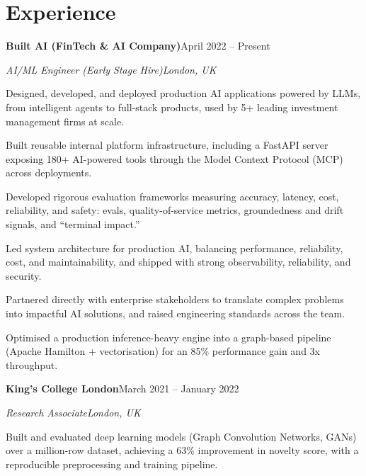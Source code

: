 \documentclass[10pt,a4paper]{article}
\newcommand{\entry}[4]{%
  {\color{company}\bfseries #1}\hfill {\color{muted}#2}\par
  \vspace{1pt}
  {\itshape #3}\hfill {\color{muted}\itshape #4}\par
  \vspace{3pt}%
}
\begin{document}
\section{Experience}
\entry{Built AI (FinTech \& AI Company)}{April 2022 -- Present}{AI/ML Engineer (Early Stage Hire)}{London, UK}
\begin{tight}
  \item Designed, developed, and deployed production AI applications powered by LLMs, from intelligent agents to full-stack products, used by 5+ leading investment management firms at scale.
  \item Built reusable internal platform infrastructure, including a FastAPI server exposing 180+ AI-powered tools through the Model Context Protocol (MCP) across deployments.
  \item Developed rigorous evaluation frameworks measuring accuracy, latency, cost, reliability, and safety: evals, quality-of-service metrics, groundedness and drift signals, and ``terminal impact.''
  \item Led system architecture for production AI, balancing performance, reliability, cost, and maintainability, and shipped with strong observability, reliability, and security.
  \item Partnered directly with enterprise stakeholders to translate complex problems into impactful AI solutions, and raised engineering standards across the team.
  \item Optimised a production inference-heavy engine into a graph-based pipeline (Apache Hamilton + vectorisation) for an 85\% performance gain and 3x throughput.
\end{tight}

\entry{King's College London}{March 2021 -- January 2022}{Research Associate}{London, UK}
\begin{tight}
  \item Built and evaluated deep learning models (Graph Convolution Networks, GANs) over a million-row dataset, achieving a 63\% improvement in novelty score, with a reproducible preprocessing and training pipeline.
\end{tight}

\end{document}
